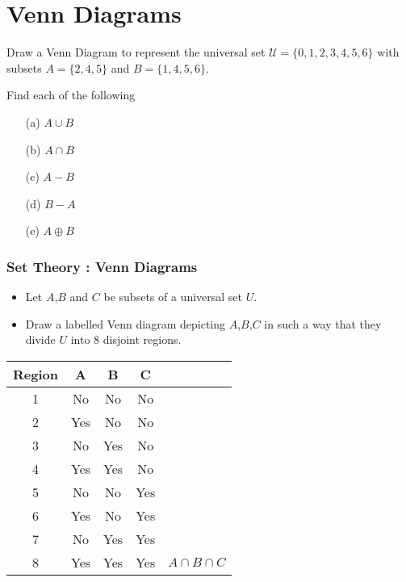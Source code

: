 \newpage
\section*{Venn Diagrams}
Draw a Venn Diagram to represent the universal set
$\mathcal{U} = \{0,1,2,3,4,5,6\}$ with subsets
$A = \{2,4,5\}$ and 
$B = \{1,4,5,6\}$.

\noindent Find each of the following
\begin{itemize}
\item[(a)] $A \cup B $
\item[(b)] $A \cap B $
\item[(c)] $A-B$
\item[(d)] $B-A$
\item[(e)] $A \oplus B$
\end{itemize}


\frametitle{Set Theory : Venn Diagrams}
\Large

\begin{itemize}
	\item Let $A$,$B$ and $C$ be subsets of a universal set $U$.
	\item Draw a labelled Venn diagram depicting $A$,$B$,$C$ in such a way that they divide $U$ into 8 disjoint regions.
\end{itemize}


\begin{center}
	\begin{tabular}{|c|c|c|c|c|}
		\hline Region & A & B & C &  \\ 
		\hline 1 &\phantom{sp} No \phantom{sp}&\phantom{sp} No\phantom{sp} & \phantom{sp} No \phantom{sp} &  \\ 
		\hline 2 & Yes & No & No &  \\ 
		\hline 3 & No & Yes & No &  \\ 
		\hline 4 & Yes & Yes & No &  \\ 
		\hline 5 & No & No & Yes &  \\ 
		\hline 6 & Yes & No & Yes &  \\ 
		\hline 7 & No & Yes & Yes &  \\ 
		\hline 8 & Yes & Yes & Yes & $A \cap B \cap C$ \\ 
		\hline 
	\end{tabular}
\end{center} 

